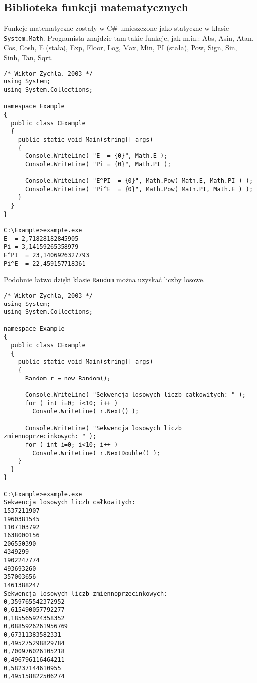 ﻿\subsection{Biblioteka funkcji matematycznych}

Funkcje matematyczne zostały w C\# umieszczone jako statyczne w klasie {\tt System.Math}.
Programista znajdzie tam takie funkcje, jak m.in.: Abs, Asin, Atan, Cos, Cosh, E (stała), 
Exp, Floor, Log, Max, Min, PI (stała), Pow, Sign, Sin, Sinh, Tan, Sqrt.

\begin{scriptsize}
\begin{verbatim}
/* Wiktor Zychla, 2003 */
using System;
using System.Collections;

namespace Example
{
  public class CExample 
  {
    public static void Main(string[] args)
    {
      Console.WriteLine( "E  = {0}", Math.E );
      Console.WriteLine( "Pi = {0}", Math.PI );

      Console.WriteLine( "E^PI  = {0}", Math.Pow( Math.E, Math.PI ) );
      Console.WriteLine( "Pi^E  = {0}", Math.Pow( Math.PI, Math.E ) );
    }
  }
}

C:\Example>example.exe
E  = 2,71828182845905
Pi = 3,14159265358979
E^PI  = 23,1406926327793
Pi^E  = 22,459157718361
\end{verbatim}
\end{scriptsize}

Podobnie łatwo dzięki klasie {\tt Random} można uzyskać liczby losowe. 

\begin{scriptsize}
\begin{verbatim}
/* Wiktor Zychla, 2003 */
using System;
using System.Collections;

namespace Example
{
  public class CExample 
  {
    public static void Main(string[] args)
    {
      Random r = new Random();

      Console.WriteLine( "Sekwencja losowych liczb całkowitych: " );
      for ( int i=0; i<10; i++ )
        Console.WriteLine( r.Next() );

      Console.WriteLine( "Sekwencja losowych liczb zmiennoprzecinkowych: " );
      for ( int i=0; i<10; i++ )
        Console.WriteLine( r.NextDouble() );
    }
  }
}

C:\Example>example.exe
Sekwencja losowych liczb całkowitych:
1537211907
1960381545
1107103792
1638000156
206550390
4349299
1902247774
493693260
357003656
1461388247
Sekwencja losowych liczb zmiennoprzecinkowych:
0,359765542372952
0,615490057792277
0,185565924358352
0,0885926261956769
0,67311383582331
0,495275298829784
0,700976026105218
0,496796116464211
0,58237144610955
0,495158822506274
\end{verbatim}
\end{scriptsize}

